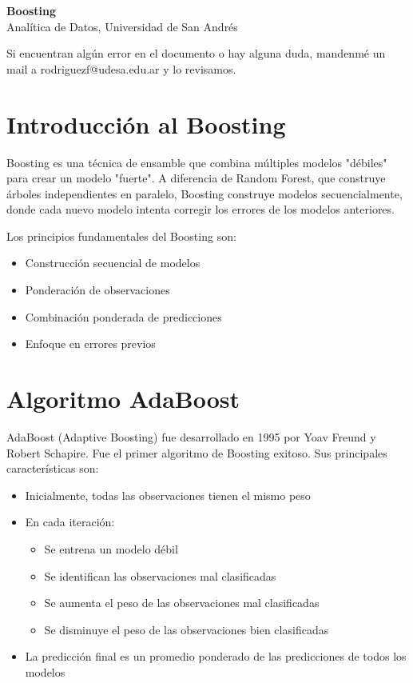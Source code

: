 \documentclass[12pt]{article}
\begin{document}
\begin{center}
  {\LARGE \textbf{Boosting}}\\[0.5em]
  {Analítica de Datos, Universidad de San Andrés}
\end{center}

Si encuentran algún error en el documento o hay alguna duda, mandenmé un mail a rodriguezf@udesa.edu.ar y lo revisamos.

\section{Introducción al Boosting}
Boosting es una técnica de ensamble que combina múltiples modelos "débiles" para crear un modelo "fuerte". A diferencia de Random Forest, que construye árboles independientes en paralelo, Boosting construye modelos secuencialmente, donde cada nuevo modelo intenta corregir los errores de los modelos anteriores.

\vspace{1em}

Los principios fundamentales del Boosting son:
\begin{itemize}
    \item Construcción secuencial de modelos
    \item Ponderación de observaciones
    \item Combinación ponderada de predicciones
    \item Enfoque en errores previos
\end{itemize}

\section{Algoritmo AdaBoost}
AdaBoost (Adaptive Boosting) fue desarrollado en 1995 por Yoav Freund y Robert Schapire. Fue el primer algoritmo de Boosting exitoso. Sus principales características son:

\begin{itemize}
    \item Inicialmente, todas las observaciones tienen el mismo peso
    \item En cada iteración:
    \begin{itemize}
        \item Se entrena un modelo débil
        \item Se identifican las observaciones mal clasificadas
        \item Se aumenta el peso de las observaciones mal clasificadas
        \item Se disminuye el peso de las observaciones bien clasificadas
    \end{itemize}
    \item La predicción final es un promedio ponderado de las predicciones de todos los modelos
\end{itemize}
\end{document}
